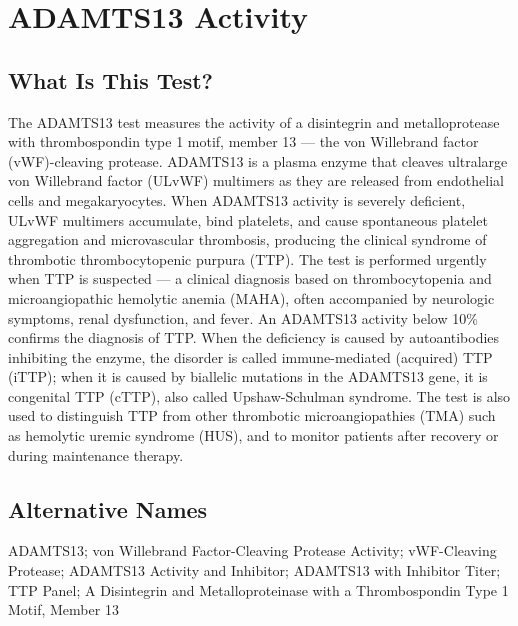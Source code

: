 \chapter{ADAMTS13 Activity}

\section*{What Is This Test?}
The ADAMTS13 test measures the activity of a disintegrin and metalloprotease with thrombospondin type 1 motif, member 13 --- the von Willebrand factor (vWF)-cleaving protease. ADAMTS13 is a plasma enzyme that cleaves ultralarge von Willebrand factor (ULvWF) multimers as they are released from endothelial cells and megakaryocytes. When ADAMTS13 activity is severely deficient, ULvWF multimers accumulate, bind platelets, and cause spontaneous platelet aggregation and microvascular thrombosis, producing the clinical syndrome of thrombotic thrombocytopenic purpura (TTP). The test is performed urgently when TTP is suspected --- a clinical diagnosis based on thrombocytopenia and microangiopathic hemolytic anemia (MAHA), often accompanied by neurologic symptoms, renal dysfunction, and fever. An ADAMTS13 activity below 10\% confirms the diagnosis of TTP. When the deficiency is caused by autoantibodies inhibiting the enzyme, the disorder is called immune-mediated (acquired) TTP (iTTP); when it is caused by biallelic mutations in the ADAMTS13 gene, it is congenital TTP (cTTP), also called Upshaw-Schulman syndrome. The test is also used to distinguish TTP from other thrombotic microangiopathies (TMA) such as hemolytic uremic syndrome (HUS), and to monitor patients after recovery or during maintenance therapy.

\section*{Alternative Names}
ADAMTS13; von Willebrand Factor-Cleaving Protease Activity; vWF-Cleaving Protease; ADAMTS13 Activity and Inhibitor; ADAMTS13 with Inhibitor Titer; TTP Panel; A Disintegrin and Metalloproteinase with a Thrombospondin Type 1 Motif, Member 13

